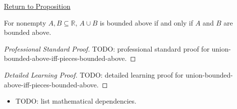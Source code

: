 \newpage
{}
\label{prf:union-bounded-above-iff-pieces-bounded-above}

\begin{remark*}[Return]
\hyperref[prop:union-bounded-above-iff-pieces-bounded-above]{Return to Proposition}
\end{remark*}

\begin{proposition*}
For nonempty $A,B\subseteq\mathbb{R}$, $A\cup B$ is bounded above if and only
if $A$ and $B$ are bounded above.
\end{proposition*}

\begin{proof}[Professional Standard Proof]
\LRAProofBodyStart
TODO: professional standard proof for union-bounded-above-iff-pieces-bounded-above.
\end{proof}

\begin{proof}[Detailed Learning Proof]
\LRAProofBodyStart
TODO: detailed learning proof for union-bounded-above-iff-pieces-bounded-above.
\end{proof}

\begin{remark*}
\end{remark*}

\begin{dependencies}
\begin{itemize}
  \item TODO: list mathematical dependencies.
\end{itemize}
\end{dependencies}

\clearpage
